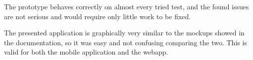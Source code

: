 The prototype behaves correctly on almost every tried test, and the found issues are not serious and would require only little work to be fixed.

The presented application is graphically very similar to the mockups showed in the documentation, so it was easy and not confusing comparing the two. This is valid for both the mobile application and the webapp.
